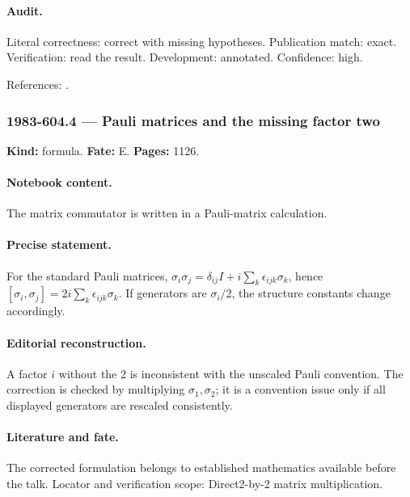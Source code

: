\paragraph{Audit.} Literal correctness: correct with missing hypotheses. Publication match: exact. Verification: read the result. Development: annotated. Confidence: high.

\noindent References: \citep{wangwenwitten2019new,daifreed1994eta}.\par

\subsubsection{1983-604.4 --- Pauli matrices and the missing factor two}

\label{item:1983-604.4}

\noindent\textbf{Kind:} formula. \textbf{Fate:} E. \textbf{Pages:} 1126.\par

\paragraph{Notebook content.} The matrix commutator is written in a Pauli-matrix calculation.

\paragraph{Precise statement.} For the standard Pauli matrices, \(\sigma_i\sigma_j=\delta_{ij}I+i\sum_k\epsilon_{ijk}\sigma_k\), hence \([\sigma_i,\sigma_j]=2i\sum_k\epsilon_{ijk}\sigma_k\). If generators are \(\sigma_i/2\), the structure constants change accordingly.

\paragraph{Editorial reconstruction.} A factor \(i\) without the 2 is inconsistent with the unscaled Pauli convention. The correction is checked by multiplying \(\sigma_1,\sigma_2\); it is a convention issue only if all displayed generators are rescaled consistently.

\paragraph{Literature and fate.} The corrected formulation belongs to established mathematics available before the talk. Locator and verification scope: Direct2-by-2 matrix multiplication.

